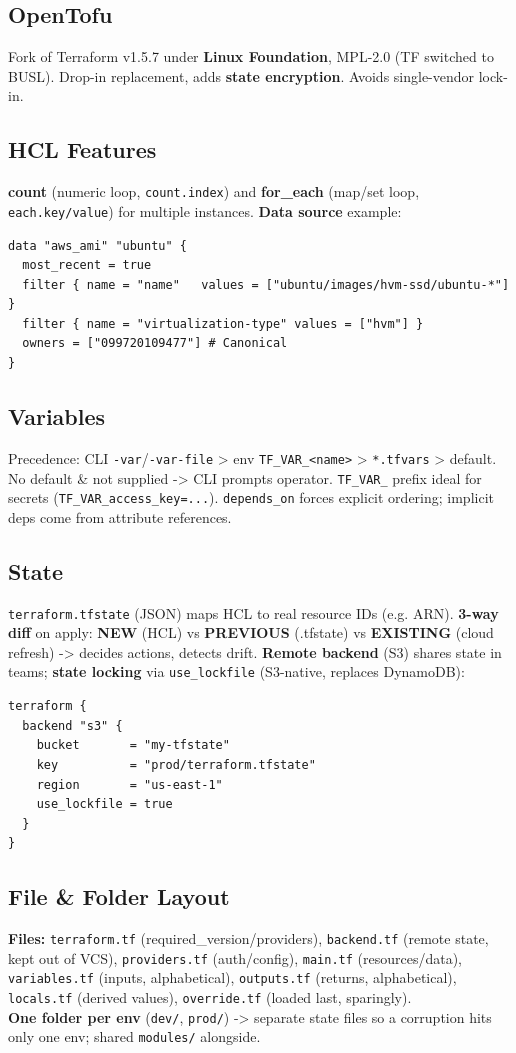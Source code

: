 \subsection{OpenTofu}
Fork of Terraform v1.5.7 under \textbf{Linux Foundation}, MPL-2.0 (TF switched to BUSL). Drop-in replacement, adds \textbf{state encryption}. Avoids single-vendor lock-in.
\subsection{HCL Features}
\textbf{count} (numeric loop, \texttt{count.index}) and \textbf{for\_each} (map/set loop, \texttt{each.key/value}) for multiple instances. \textbf{Data source} example:
\begin{lstlisting}[language=hcl]
data "aws_ami" "ubuntu" {
  most_recent = true
  filter { name = "name"   values = ["ubuntu/images/hvm-ssd/ubuntu-*"] }
  filter { name = "virtualization-type" values = ["hvm"] }
  owners = ["099720109477"] # Canonical
}
\end{lstlisting}
\subsection{Variables}
Precedence: CLI \texttt{-var}/\texttt{-var-file} > env \texttt{TF\_VAR\_<name>} > \texttt{*.tfvars} > default. No default \& not supplied -> CLI prompts operator. \texttt{TF\_VAR\_} prefix ideal for secrets (\texttt{TF\_VAR\_access\_key=...}). \texttt{depends\_on} forces explicit ordering; implicit deps come from attribute references.
\subsection{State}
\texttt{terraform.tfstate} (JSON) maps HCL to real resource IDs (e.g. ARN). \textbf{3-way diff} on apply: \textbf{NEW} (HCL) vs \textbf{PREVIOUS} (.tfstate) vs \textbf{EXISTING} (cloud refresh) -> decides actions, detects drift. \textbf{Remote backend} (S3) shares state in teams; \textbf{state locking} via \texttt{use\_lockfile} (S3-native, replaces DynamoDB):
\begin{lstlisting}[language=hcl]
terraform {
  backend "s3" {
    bucket       = "my-tfstate"
    key          = "prod/terraform.tfstate"
    region       = "us-east-1"
    use_lockfile = true
  }
}
\end{lstlisting}
\subsection{File \& Folder Layout}
\textbf{Files:} \texttt{terraform.tf} (required\_version/providers), \texttt{backend.tf} (remote state, kept out of VCS), \texttt{providers.tf} (auth/config), \texttt{main.tf} (resources/data), \texttt{variables.tf} (inputs, alphabetical), \texttt{outputs.tf} (returns, alphabetical), \texttt{locals.tf} (derived values), \texttt{override.tf} (loaded last, sparingly). \\
\textbf{One folder per env} (\texttt{dev/}, \texttt{prod/}) -> separate state files so a corruption hits only one env; shared \texttt{modules/} alongside.

